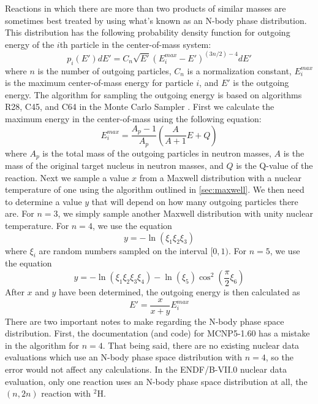 Reactions in which there are more than two products of similar masses are
sometimes best treated by using what's known as an N-body phase
distribution. This distribution has the following probability density function
for outgoing energy of the $i$th particle in the center-of-mass system:
\begin{equation}
  \label{eq:n-body-pdf}
  p_i(E') dE' = C_n \sqrt{E'} (E_i^{max} - E')^{(3n/2) - 4} dE'
\end{equation}
where $n$ is the number of outgoing particles, $C_n$ is a normalization
constant, $E_i^{max}$ is the maximum center-of-mass energy for particle $i$, and
$E'$ is the outgoing energy. The algorithm for sampling the outgoing energy is
based on algorithms R28, C45, and C64 in the Monte Carlo Sampler
\cite{lanl-everett-1983}. First we calculate the maximum energy in the
center-of-mass using the following equation:
\begin{equation}
  \label{eq:n-body-emax}
  E_i^{max} = \frac{A_p - 1}{A_p} \left ( \frac{A}{A+1} E + Q \right )
\end{equation}
where $A_p$ is the total mass of the outgoing particles in neutron masses, $A$
is the mass of the original target nucleus in neutron masses, and $Q$ is the
Q-value of the reaction. Next we sample a value $x$ from a Maxwell distribution
with a nuclear temperature of one using the algorithm outlined in
\autoref{sec:maxwell}. We then need to determine a value $y$ that will depend on
how many outgoing particles there are. For $n = 3$, we simply sample another
Maxwell distribution with unity nuclear temperature. For $n = 4$, we use the
equation
\begin{equation}
  \label{eq:n-body-y4}
  y = -\ln ( \xi_1 \xi_2 \xi_3 )
\end{equation}
where $\xi_i$ are random numbers sampled on the interval
$[0,1)$. For $n = 5$, we use the equation
\begin{equation}
  \label{eq:n-body-y5}
  y = -\ln ( \xi_1 \xi_2 \xi_3 \xi_4 ) - \ln ( \xi_5 ) \cos^2 \left (
  \frac{\pi}{2} \xi_6 \right )
\end{equation}
After $x$ and $y$ have been determined, the outgoing energy is then
calculated as
\begin{equation}
  \label{eq:n-body-energy}
  E' = \frac{x}{x + y} E_i^{max}
\end{equation}
There are two important notes to make regarding the N-body phase space
distribution. First, the documentation (and code) for MCNP5-1.60 has a mistake
in the algorithm for $n = 4$. That being said, there are no existing nuclear
data evaluations which use an N-body phase space distribution with $n = 4$, so
the error would not affect any calculations. In the ENDF/B-VII.0 nuclear data
evaluation, only one reaction uses an N-body phase space distribution at all,
the $(n,2n)$ reaction with $^2$H.

